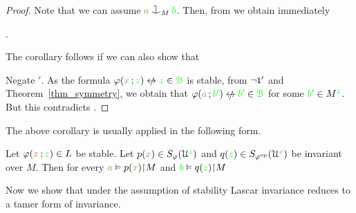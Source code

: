\begin{proof}
  Note that we can assume ${\mr a}\cnonfork_M{\gr b}$.
  Then, from  we obtain immediately

  .

  The corollary follows if we can also show that


  Negate $'$.
  As the formula $\phi({\mr x}\,;{\gr z})\niff{\gr z}\in\grB$ is stable, from $\neg\textsf{\small 1}'$ and Theorem~\ref{thm_symmetry}, we obtain that $\phi({\mr a}\,;{\gr b'})\niff{\gr b'}\in\grB$ for some ${\color{green} b'}\in M^{\color{green} z}$.
  But this contradicts .
\end{proof}

The above corollary is usually applied in the following form. 

\begin{corollary}\label{corol_harrington1}
  Let $\varphi({\color{brown} x}\,;{\color{green} z})\in L$ be stable.
  Let $p({\color{brown} x})\in S_\varphi(\EuScript U^{\color{green} z})$ and $q({\color{green} z})\in S_{\varphi^{\rm op}}(\EuScript U^{\color{brown} x})$ be invariant over $M$.
  Then for every ${\color{brown} a}\vDash p({\color{brown} x}){\restriction}M$ and ${\color{green} b}\vDash q({\color{green} z}){\restriction}M$\smallskip
  
\end{corollary}

Now we show that under the assumption of stability Lascar invariance reduces to a tamer form of invariance.

